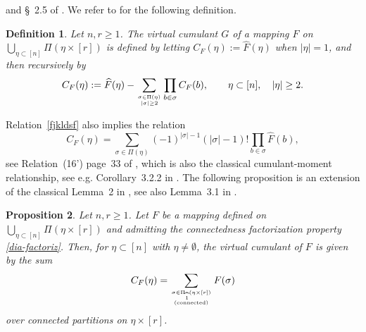 \documentclass[12pt]{article}
\newcommand{\E}{\mathbb{E}}
\newtheorem{prop}{Proposition}[section]
\newtheorem{definition}[prop]{Definition}
\numberwithin{equation}{section}
\begin{document}
 and \S~2.5 of \cite{peccatitaqqu}. 
 We refer to \cite[p.~33]{MalyshevMinlos91} for the following definition.
\begin{definition}
  Let $n,r\geq 1$.
  The virtual cumulant $G$ of 
 a mapping $F$ on $\bigcup_{\eta \subset [n]} \Pi ( \eta \times [r])$ 
 is defined by letting  
 $C_F ( \eta ):=\widehat{F}( \eta )$ when $| \eta |=1$, and
 then recursively by 
\begin{equation}
  \label{fjkldsf}
  C_F ( \eta ):=\widehat{F}( \eta )-\sum_{
    { \sigma \in \Pi (\eta )
    \atop 
    |\sigma|\geq 2
    }
  }
  \prod_{b \in \sigma } C_F ( b ), \qquad
  \eta \subset [n], \quad |\eta |\geq 2. 
\end{equation}
\end{definition} 
Relation~\eqref{fjkldsf} also implies the relation 
 \begin{equation}
   \label{jlkdf3} 
 C_F ( \eta )=
 \sum_{
   \sigma \in \Pi ( \eta )
 }
 (-1)^{|\sigma |-1} (|\sigma |-1)! \prod_{b\in \sigma} \widehat{F} ( b ), 
\end{equation}
 see Relation~(16') page~33 of \cite{MalyshevMinlos91},
 which is also the classical cumulant-moment relationship,
 see e.g. Corollary~3.2.2 in \cite{peccatitaqqu}. 
\noindent  
The following proposition is an extension of
the classical Lemma~2 in \cite[p.~34]{MalyshevMinlos91},
see also Lemma~3.1 in \cite{khorunzhiy}.
\begin{prop}
\label{mainthm-1}
Let $n,r\geq 1$. 
Let $F$ be a mapping defined on $\bigcup_{\eta \subset [n]}
 \Pi ( \eta \times [r])$ and admitting the {connectedness factorization} property
 \eqref{dia-factoriz}.
 Then, for $\eta \subset [n]$ with $\eta \ne\emptyset$, 
 the virtual cumulant of $F$ is given by the sum 
\begin{equation}
\label{keylma-2}
C_F (\eta ) = \sum_{\sigma \in \Pi_{\widehat{1}} ( \eta \times [r] )
  \atop {\rm (connected)}}
F(\sigma )
\end{equation}
over connected partitions on $\eta \times [r]$. 
\end{prop} 
\end{document}
